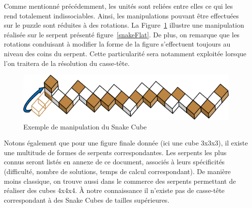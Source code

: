 \newpage Comme mentionné précédemment, les unités sont reliées entre elles ce qui les rend totalement indissociables. Ainsi, les manipulations pouvant être effectuées sur le puzzle sont réduites à des rotations. La Figure~\ref{snakeMove} illustre une manipulation réalisée sur le serpent présenté figure~\ref{snakeFlat}. De plus, on remarque que les rotations conduisant à modifier la forme de la figure s’effectuent toujours au niveau des coins du serpent. Cette particularité sera notamment exploitée lorsque l’on traitera de la résolution du casse-tête.

\begin{figure}[h]
 \centering
 \includegraphics[scale=0.3,keepaspectratio=true]{img/snakeCubeMove.png}
 \caption{Exemple de manipulation du Snake Cube}
 \label{snakeMove}
\end{figure}

Notons également  que pour une figure finale donnée (ici une cube 3x3x3), il existe une multitude de formes de serpents correspondantes. Les serpents les plus connus seront listés en annexe de ce document, associés à leurs spécificités (difficulté, nombre de solutions, temps de calcul correspondant). De manière moins classique, on trouve aussi dans le commerce des serpents permettant de réaliser des cubes 4x4x4. À notre connaissance il n’existe pas de casse-tête correspondant à des Snake Cubes de tailles supérieures.
